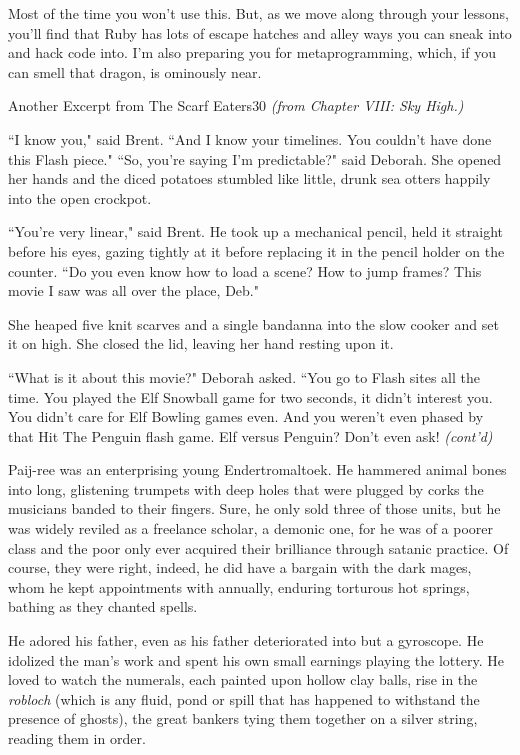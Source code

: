 \documentclass[12pt,twoside]{report}
\begin{document}
Most of the time you won't use this.  But, as we move along through
your lessons, you'll find that Ruby has lots of escape hatches and
alley ways you can sneak into and hack code into.  I'm also preparing
you for metaprogramming, which, if you can smell that dragon, is
ominously near.  

	\begin{sidebar}{Another Excerpt from The Scarf Eaters}{30}
		\textit{(from Chapter VIII: Sky High.)}\vspace{6pt}
		
``I know you," said Brent. ``And I know your timelines. You couldn't have done this Flash piece."
``So, you're saying I'm predictable?" said Deborah. She opened her hands and the diced potatoes stumbled like little, drunk sea otters happily into the open crockpot.\vspace{6pt}

``You're very linear," said Brent. He took up a mechanical pencil, held it straight before his eyes, gazing tightly at it before replacing it in the pencil holder on the counter. ``Do you even know how to load a scene? How to jump frames? This movie I saw was all over the place, Deb."\vspace{6pt}

She heaped five knit scarves and a single bandanna into the slow cooker and set it on high. She closed the lid, leaving her hand resting upon it.\vspace{6pt}

``What is it about this movie?" Deborah asked. ``You go to Flash sites all the time. You played the Elf Snowball game for two seconds, it didn't interest you. You didn't care for Elf Bowling games even. And you weren't even phased by that Hit The Penguin flash game. Elf versus Penguin? Don't even ask! \textit{(cont'd)}
	\end{sidebar}

Paij-ree was an enterprising young Endertromaltoek.
He hammered animal bones into long, glistening trumpets with deep
holes that were plugged by corks the musicians banded to their
fingers.  Sure, he only sold three of those units, but he was widely
reviled as a freelance scholar, a demonic one, for he was of a poorer
class and the poor only ever acquired their brilliance through satanic
practice.  Of course, they were right, indeed, he did have a bargain
with the dark mages, whom he kept appointments with annually, enduring
torturous hot springs, bathing as they chanted spells.

He adored his father, even as his father deteriorated into but a
gyroscope.  He idolized the man's work and spent his own small
earnings playing the lottery.  He loved to watch the numerals, each
painted upon hollow clay balls, rise in the {\em robloch} (which is
any fluid, pond or spill that has happened to withstand the presence
of ghosts), the great bankers tying them together on a silver string,
reading them in order.
\end{document}
